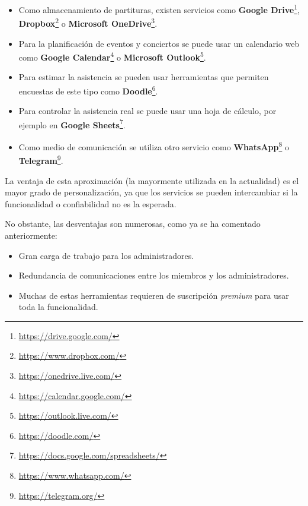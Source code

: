 \begin{itemize}
    \item Como almacenamiento de partituras, existen servicios como \textbf{Google Drive}\footnote{\url{https://drive.google.com/}}, \textbf{Dropbox}\footnote{\url{https://www.dropbox.com/}} o \textbf{Microsoft OneDrive}\footnote{\url{https://onedrive.live.com/}}.
    \item Para la planificación de eventos y conciertos se puede usar un calendario web como \textbf{Google Calendar}\footnote{\url{https://calendar.google.com/}} o \textbf{Microsoft Outlook}\footnote{\url{https://outlook.live.com/}}.
    \item Para estimar la asistencia se pueden usar herramientas que permiten encuestas de este tipo como \textbf{Doodle}\footnote{\url{https://doodle.com/}}.
    \item Para controlar la asistencia real se puede usar una hoja de cálculo, por ejemplo en \textbf{Google Sheets}\footnote{\url{https://docs.google.com/spreadsheets/}}.
    \item Como medio de comunicación se utiliza otro servicio como \textbf{WhatsApp}\footnote{\url{https://www.whatsapp.com/}} o \textbf{Telegram}\footnote{\url{https://telegram.org/}}.
\end{itemize}

La ventaja de esta aproximación (la mayormente utilizada en la actualidad) es el mayor grado de personalización, ya que los servicios se pueden intercambiar si la funcionalidad o confiabilidad no es la esperada.

No obstante, las desventajas son numerosas, como ya se ha comentado anteriormente:
\begin{itemize}
    \item Gran carga de trabajo para los administradores.
    \item Redundancia de comunicaciones entre los miembros y los administradores.
    \item Muchas de estas herramientas requieren de suscripción \textit{premium} para usar toda la funcionalidad.
\end{itemize}
